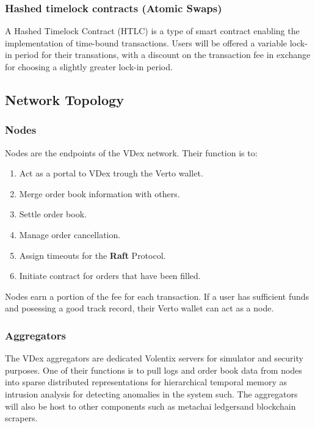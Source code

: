 \documentclass[]{article}
\begin{document}
	\subsubsection{Hashed timelock contracts (Atomic Swaps)}
	A Hashed Timelock Contract (HTLC)\cite{22} is a type of smart contract enabling the implementation of time-bound transactions.
	Users will be offered a variable lock-in period for their transations, 
	with a discount on the transaction fee in exchange for choosing a slightly greater lock-in period.
	
	\subsection{Network Topology}
	\subsubsection{Nodes}
	Nodes are the endpoints of the VDex network.
	Their function is to:\
	\begin{enumerate}
		\item Act as a portal to VDex trough the Verto wallet.
		\item Merge order book information with others.
		\item Settle order book.\
		\item Manage order cancellation.\
		\item Assign timeouts for the \textbf{Raft} Protocol.\
		\item Initiate contract for orders that have been filled.
	\end{enumerate}

Nodes earn a portion of the fee for each transaction.
If a user has sufficient funds and posessing a good track record, their Verto wallet can act as a node.
	
	\subsubsection{Aggregators}
	
	The VDex aggregators are dedicated Volentix servers for simulator and security purposes. 
	One of their functions is to pull logs and order book data from nodes into sparse distributed representations for hierarchical temporal memory
	as intrusion \cite{24} analysis for detecting anomalies in the system such. 
	The aggregators will also be host to other components such as metachai  ledgers\cite{20}and blockchain scrapers.
	 
	
\end{document}
